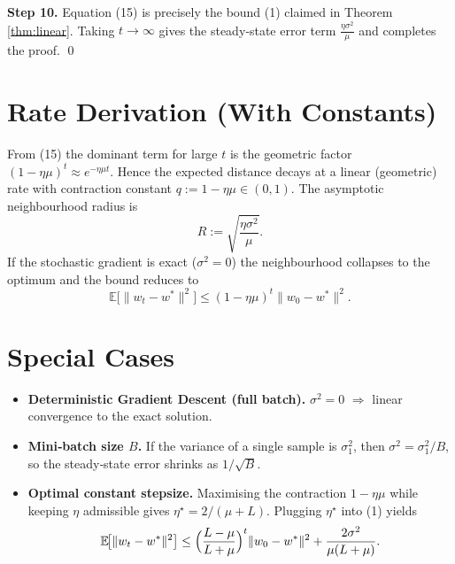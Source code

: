 \documentclass[11pt]{article}
\newcommand{\E}{\mathbb{E}}
\begin{document}
\noindent\textbf{Step 10.} Equation (15) is precisely the bound (1) claimed in Theorem \ref{thm:linear}. Taking $t\to\infty$ gives the steady‑state error term $\frac{\eta\sigma^{2}}{\mu}$ and completes the proof. \qed

\section*{Rate Derivation (With Constants)}
From (15) the dominant term for large $t$ is the geometric factor $(1-\eta\mu)^{t}\approx e^{-\eta\mu t}$. Hence the expected distance decays at a linear (geometric) rate with contraction constant $q:=1-\eta\mu\in(0,1)$. The asymptotic neighbourhood radius is
\[
R:=\sqrt{\frac{\eta\sigma^{2}}{\mu}}.
\]
If the stochastic gradient is exact ($\sigma^{2}=0$) the neighbourhood collapses to the optimum and the bound reduces to
\[
\E\!\big[\|w_{t}-w^{*}\|^{2}\big]\le (1-\eta\mu)^{t}\|w_{0}-w^{*}\|^{2}.
\]

\section*{Special Cases}
\begin{itemize}
\item \textbf{Deterministic Gradient Descent (full batch).} $\sigma^{2}=0$ $\Rightarrow$ linear convergence to the exact solution.
\item \textbf{Mini‑batch size $B$.} If the variance of a single sample is $\sigma_{1}^{2}$, then $\sigma^{2}=\sigma_{1}^{2}/B$, so the steady‑state error shrinks as $1/\sqrt{B}$.
\item \textbf{Optimal constant stepsize.} Maximising the contraction $1-\eta\mu$ while keeping $\eta$ admissible gives $\eta^{\star}=2/(\mu+L)$. Plugging $\eta^{\star}$ into (1) yields
\[
\E\!\big[\|w_{t}-w^{*}\|^{2}\big]\le
\Bigl(\frac{L-\mu}{L+\mu}\Bigr)^{t}\|w_{0}-w^{*}\|^{2}
+ \frac{2\sigma^{2}}{\mu(L+\mu)}.
\]
\end{itemize}
\end{document}

